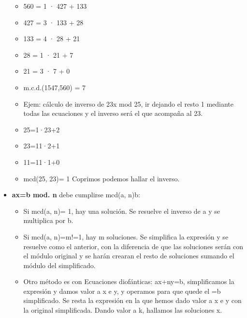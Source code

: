 \documentclass[12pt, twoside, openright]{report} %
\begin{document}
\begin{itemize}
\begin{itemize}
    \item 560 = 1 · 427 + 133
      
    \item 427 = 3 · 133 + 28
      
    \item 133 = 4 · 28 + 21
      
    \item 28 = 1 · 21 + 7
      
    \item 21 = 3 · 7 + 0
      
    \item m.c.d.(1547,560) = 7
      
    \item Ejem: cálculo de inverso de 23x mod 25, ir dejando el resto 1
      mediante todas las ecuaciones y el inverso será el que acompaña al
      23.
      
    \item 25=1·23+2
      
    \item 23=11·2+1
      
    \item 11=11·1+0
      
    \item mcd(25, 23)= 1 Coprimos podemos hallar el inverso.
      
    \end{itemize}
  \item \textbf{ax=b mod. n} debe cumplirse mcd(a, n)\textbar b:
    

    \begin{itemize}
    \item Si mcd(a, n)= 1, hay una solución. Se resuelve el inverso de a y
      se multiplica por b.
      
    \item Si mcd(a, n)=m!=1, hay m soluciones. Se simplifica la expresión y
      se resuelve como el anterior, con la diferencia de que las
      soluciones serán con el módulo original y se harán crearan el
      resto de soluciones sumando el módulo del simplificado.
      
    \item Otro método es con Ecuaciones diofánticas: ax+ny=b, simplificamos
      la expresión y damos valor a x e y, y operamos para que quede el
      =b simplificado. Se resta la expresión en la que hemos dado valor
      a x e y con la original simplificada. Dando valor a k, hallamos
      las soluciones x.
      

\end{itemize}
\end{itemize}
\end{document}
